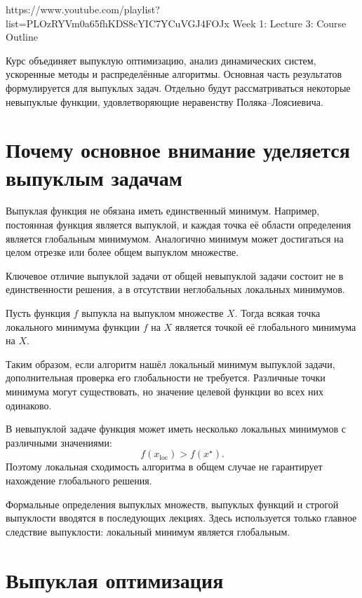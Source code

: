 
\sourcevideo
    {https://www.youtube.com/playlist?list=PLOzRYVm0a65fhKDS8cYIC7YCuVGJ4FOJx}
    {Week 1: Lecture 3: Course Outline}

Курс объединяет выпуклую оптимизацию, анализ динамических систем,
ускоренные методы и распределённые алгоритмы. Основная часть
результатов формулируется для выпуклых задач. Отдельно будут
рассматриваться некоторые невыпуклые функции, удовлетворяющие
неравенству Поляка--Лоясиевича.

\section{Почему основное внимание уделяется выпуклым задачам}

Выпуклая функция не обязана иметь единственный минимум. Например,
постоянная функция является выпуклой, и каждая точка её области
определения является глобальным минимумом. Аналогично минимум может
достигаться на целом отрезке или более общем выпуклом множестве.

Ключевое отличие выпуклой задачи от общей невыпуклой задачи состоит
не в единственности решения, а в отсутствии неглобальных локальных
минимумов.

\begin{theorem}
Пусть функция \(f\) выпукла на выпуклом множестве \(X\). Тогда всякая
точка локального минимума функции \(f\) на \(X\) является точкой её
глобального минимума на \(X\).
\end{theorem}

Таким образом, если алгоритм нашёл локальный минимум выпуклой задачи,
дополнительная проверка его глобальности не требуется. Различные
точки минимума могут существовать, но значение целевой функции во
всех них одинаково.

В невыпуклой задаче функция может иметь несколько локальных минимумов
с различными значениями:
\[
    f(x_{\mathrm{loc}})
    >
    f(x^\star).
\]
Поэтому локальная сходимость алгоритма в общем случае не гарантирует
нахождение глобального решения.

\begin{remark}
Формальные определения выпуклых множеств, выпуклых функций и строгой
выпуклости вводятся в последующих лекциях. Здесь используется только
главное следствие выпуклости: локальный минимум является глобальным.
\end{remark}

\section{Выпуклая оптимизация}

